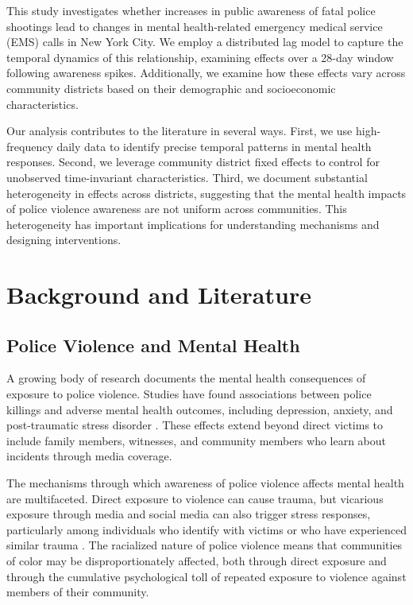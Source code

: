 \documentclass[11pt,a4paper]{article}
\begin{document}
This study investigates whether increases in public awareness of fatal police shootings lead to changes in mental health-related emergency medical service (EMS) calls in New York City. We employ a distributed lag model to capture the temporal dynamics of this relationship, examining effects over a 28-day window following awareness spikes. Additionally, we examine how these effects vary across community districts based on their demographic and socioeconomic characteristics.

Our analysis contributes to the literature in several ways. First, we use high-frequency daily data to identify precise temporal patterns in mental health responses. Second, we leverage community district fixed effects to control for unobserved time-invariant characteristics. Third, we document substantial heterogeneity in effects across districts, suggesting that the mental health impacts of police violence awareness are not uniform across communities. This heterogeneity has important implications for understanding mechanisms and designing interventions.

\section{Background and Literature}

\subsection{Police Violence and Mental Health}

A growing body of research documents the mental health consequences of exposure to police violence. Studies have found associations between police killings and adverse mental health outcomes, including depression, anxiety, and post-traumatic stress disorder \citep{bor2018, decker2021}. These effects extend beyond direct victims to include family members, witnesses, and community members who learn about incidents through media coverage.

The mechanisms through which awareness of police violence affects mental health are multifaceted. Direct exposure to violence can cause trauma, but vicarious exposure through media and social media can also trigger stress responses, particularly among individuals who identify with victims or who have experienced similar trauma \citep{hesselink2020}. The racialized nature of police violence means that communities of color may be disproportionately affected, both through direct exposure and through the cumulative psychological toll of repeated exposure to violence against members of their community.
\end{document}
